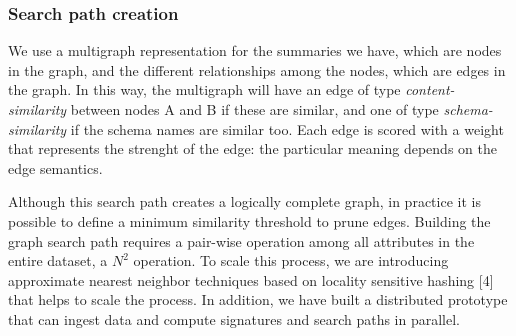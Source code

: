 \subsubsection{Search path creation}

We use a multigraph representation for the summaries we have, which are nodes in
the graph, and the different relationships among the nodes, which are edges in
the graph. In this way, the multigraph will have an edge of type
\emph{content-similarity} between nodes A and B if these are similar, and one of
type \emph{schema-similarity} if the schema names are similar too. Each edge is
scored with a weight that represents the strenght of the edge: the particular
meaning depends on the edge semantics.

Although this search path creates a logically complete graph, in practice it is
possible to define a minimum similarity threshold to prune edges. Building the
graph search path requires a pair-wise operation among all attributes in the
entire dataset, a $N^2$ operation. To scale this process, we are introducing
approximate nearest neighbor techniques based on locality sensitive hashing [4]
that helps to scale the process. In addition, we have built a distributed
prototype that can ingest data and compute signatures and search paths in
parallel.


